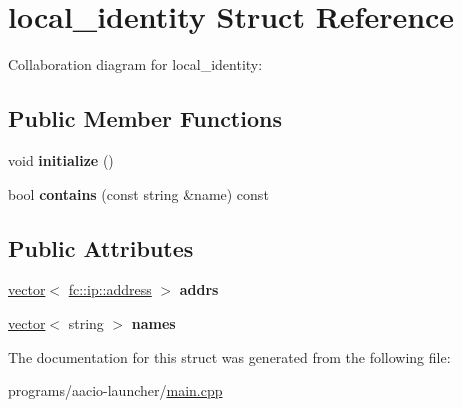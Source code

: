 \hypertarget{structlocal__identity}{}\section{local\+\_\+identity Struct Reference}
\label{structlocal__identity}


Collaboration diagram for local\+\_\+identity\+:
\subsection*{Public Member Functions}
\begin{DoxyCompactItemize}
\item 
\mbox{\label{structlocal__identity_a2fd343eec2b3f79db81dc97ae6dddd5b}} 
void {\bfseries initialize} ()
\item 
\mbox{\label{structlocal__identity_af3f117131afdf1dac924d3861639c3b7}} 
bool {\bfseries contains} (const string \&name) const
\end{DoxyCompactItemize}
\subsection*{Public Attributes}
\begin{DoxyCompactItemize}
\item 
\mbox{\label{structlocal__identity_ab8a1b8fbbe33949a33c5c215c9f6f7bb}} 
\mbox{\hyperlink{classstd_1_1vector}{vector}}$<$ \mbox{\hyperlink{classfc_1_1ip_1_1address}{fc\+::ip\+::address}} $>$ {\bfseries addrs}
\item 
\mbox{\label{structlocal__identity_a48222ce432b59ec9244d956ef773f804}} 
\mbox{\hyperlink{classstd_1_1vector}{vector}}$<$ string $>$ {\bfseries names}
\end{DoxyCompactItemize}


The documentation for this struct was generated from the following file\+:\begin{DoxyCompactItemize}
\item 
programs/aacio-\/launcher/\mbox{\hyperlink{programs_2aacio-launcher_2main_8cpp}{main.\+cpp}}\end{DoxyCompactItemize}
